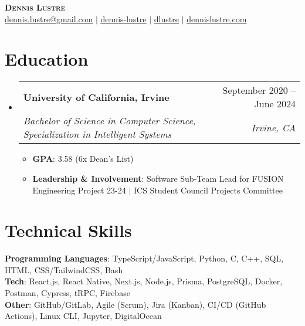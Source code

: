 \documentclass[letterpaper,11pt]{article}
\makeatletter
\newcommand{\resumeItem}[1]{
  \item\setstretch{.95}\small{
    {#1 \vspace{-2pt}}
  }
}
\newcommand{\resumeSubheading}[4]{
  \vspace{-2pt}\item
    \begin{tabular*}{0.97\textwidth}[t]{l@{\extracolsep{\fill}}r}
      \textbf{#1} & #2 \\
      \textit{\small#3} & \textit{\small #4} \\
    \end{tabular*}\vspace{-4.8pt}
}
\newcommand{\resumeSubHeadingListStart}{\begin{itemize}[leftmargin=0.15in, label={}]}
\newcommand{\resumeSubHeadingListEnd}{\end{itemize}}
\newcommand{\resumeItemListStart}{\begin{itemize}}
\newcommand{\resumeItemListEnd}{\end{itemize}\vspace{-5pt}}
\makeatother
\begin{document}
\begin{center}
    \textbf{\Huge \scshape Dennis Lustre} \\ \vspace{1pt}
    \faEnvelope{ }\href{mailto:dennis.lustre@gmail.com}{\uline{dennis.lustre@gmail.com}} $|$ 
    \faLinkedinSquare{ }\href{https://linkedin.com/in/dennis-lustre}{\uline{dennis-lustre}} $|$
    \faGithub{ }\href{https://github.com/dlustre}{\uline{dlustre}} $|$
    \faGlobe{ }\href{https://dennislustre.com}{\uline{dennislustre.com}}
\end{center}


\section{Education}

  \resumeSubHeadingListStart
    \resumeSubheading
      {University of California, Irvine}{September 2020 -- June 2024}
      {Bachelor of Science in Computer Science, Specialization in Intelligent Systems}{Irvine, CA}
    \resumeItemListStart
        \resumeItem{\textbf{GPA}: 3.58 (6x Dean's List)}
        \resumeItem{\textbf{Leadership \& Involvement}: Software Sub-Team Lead for FUSION Engineering Project 23-24 $|$ ICS Student Council Projects Committee}
    \resumeItemListEnd

  \resumeSubHeadingListEnd

\section{Technical Skills}
 \begin{itemize}[leftmargin=0.15in, label={}]
    \small{\item{
     \textbf{Programming Languages}{: TypeScript/JavaScript, Python, C, C++, SQL, HTML, CSS/TailwindCSS, Bash} \\
     \textbf{Tech}{: React.js, React Native, Next.js, Node.js, Prisma, PostgreSQL, Docker, Postman, Cypress, tRPC, Firebase} \\
     \textbf{Other}{: GitHub/GitLab, Agile (Scrum), Jira (Kanban), CI/CD (GitHub Actions), Linux CLI, Jupyter, DigitalOcean} \\
    }}
 \end{itemize}
 
\end{document}
